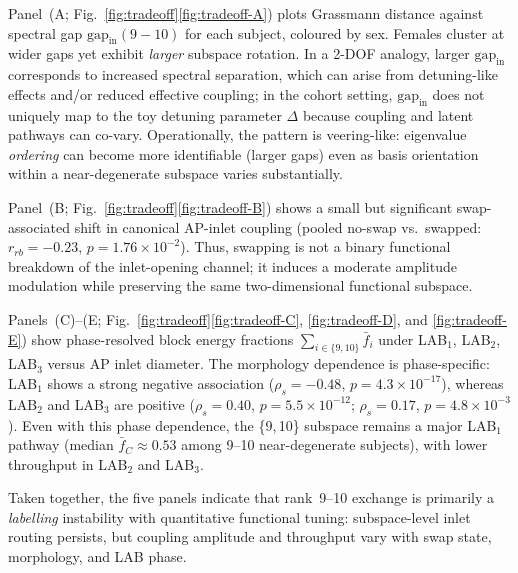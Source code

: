 \documentclass[11pt]{article}
\begin{document}
Panel~(A; Fig.~\ref{fig:tradeoff}\ref{fig:tradeoff-A}) plots Grassmann distance against spectral gap $\mathrm{gap}_{\mathrm{in}}(9{-}10)$ for each subject, coloured by sex.
Females cluster at wider gaps yet exhibit \emph{larger} subspace rotation.
In a 2-DOF analogy, larger $\mathrm{gap}_{\mathrm{in}}$ corresponds to increased spectral separation, which can arise from detuning-like effects and/or reduced effective coupling; in the cohort setting, $\mathrm{gap}_{\mathrm{in}}$ does not uniquely map to the toy detuning parameter $\Delta$ because coupling and latent pathways can co-vary.
Operationally, the pattern is veering-like: eigenvalue \emph{ordering} can become more identifiable (larger gaps) even as basis orientation within a near-degenerate subspace varies substantially.

Panel~(B; Fig.~\ref{fig:tradeoff}\ref{fig:tradeoff-B}) shows a small but significant swap-associated shift in canonical AP-inlet coupling (pooled no-swap vs.\ swapped: $r_{rb}=-0.23$, $p=1.76\times 10^{-2}$).
Thus, swapping is not a binary functional breakdown of the inlet-opening channel; it induces a moderate amplitude modulation while preserving the same two-dimensional functional subspace.

Panels~(C)--(E; Fig.~\ref{fig:tradeoff}\ref{fig:tradeoff-C}, \ref{fig:tradeoff-D}, and \ref{fig:tradeoff-E}) show phase-resolved block energy fractions $\sum_{i \in \{9,10\}} \bar f_i$ under LAB$_1$, LAB$_2$, LAB$_3$ versus AP inlet diameter.
The morphology dependence is phase-specific: LAB$_1$ shows a strong negative association ($\rho_s=-0.48$, $p=4.3\times10^{-17}$), whereas LAB$_2$ and LAB$_3$ are positive ($\rho_s=0.40$, $p=5.5\times10^{-12}$; $\rho_s=0.17$, $p=4.8\times10^{-3}$).
Even with this phase dependence, the \{9,\,10\} subspace remains a major LAB$_1$ pathway (median $\bar f_C \approx 0.53$ among 9--10 near-degenerate subjects), with lower throughput in LAB$_2$ and LAB$_3$.

Taken together, the five panels indicate that rank~9--10 exchange is primarily a \emph{labelling} instability with quantitative functional tuning: subspace-level inlet routing persists, but coupling amplitude and throughput vary with swap state, morphology, and LAB phase.
\end{document}
